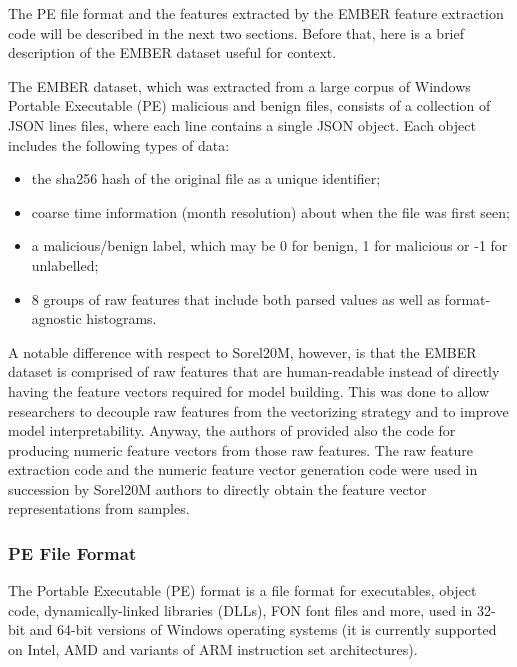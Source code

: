 \documentclass[pdfa%
,cucitura%
]{toptesi}
\begin{document}
The PE file format and the features extracted by the EMBER feature extraction code will be described in the next two sections. Before that, here is a brief description of the EMBER dataset useful for context.

The EMBER dataset, which was extracted from a large corpus of Windows Portable Executable (PE) malicious and benign files, consists of a collection of JSON lines files, where each line contains a single JSON object. Each object includes the following types of data:
\begin{itemize}
	\item the sha256 hash of the original file as a unique identifier;
	
	\item coarse time information (month resolution) about when the file was first seen;
	
	\item a malicious/benign label, which may be 0 for benign, 1 for malicious or -1 for unlabelled;
	
	\item 8 groups of raw features that include both parsed values as well as format-agnostic histograms.
\end{itemize}

A notable difference with respect to Sorel20M, however, is that the EMBER dataset is comprised of raw features that are human-readable instead of directly having the feature vectors required for model building. This was done to allow researchers to decouple raw features from the vectorizing strategy and to improve model interpretability. Anyway, the authors of \cite{AndersonEMBER} provided also the code for producing numeric feature vectors from those raw features. The raw feature extraction code and the numeric feature vector generation code were used in succession by Sorel20M authors to directly obtain the feature vector representations from samples.

\subsubsection{PE File Format}
The Portable Executable (PE) format is a file format for executables, object code, dynamically-linked libraries (DLLs), FON font files and more, used in 32-bit and 64-bit versions of Windows operating systems (it is currently supported on Intel, AMD and variants of ARM instruction set architectures).
\end{document}
